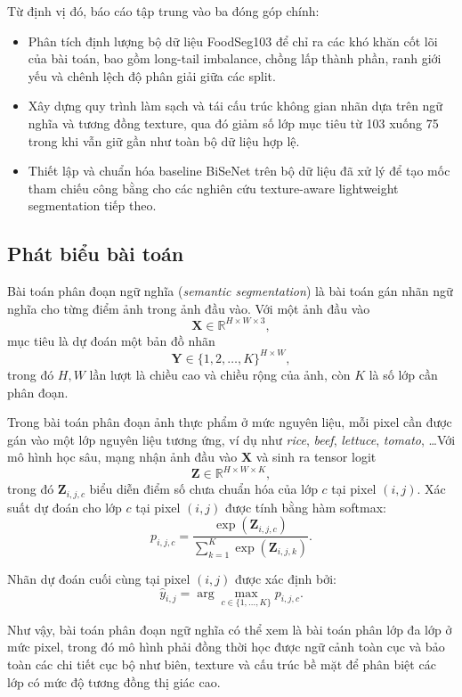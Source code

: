 Từ định vị đó, báo cáo tập trung vào ba đóng góp chính:
\begin{itemize}[leftmargin=1.5em]
    \item Phân tích định lượng bộ dữ liệu FoodSeg103 để chỉ ra các khó khăn cốt lõi của bài toán, bao gồm long-tail imbalance, chồng lấp thành phần, ranh giới yếu và chênh lệch độ phân giải giữa các split.
    \item Xây dựng quy trình làm sạch và tái cấu trúc không gian nhãn dựa trên ngữ nghĩa và tương đồng texture, qua đó giảm số lớp mục tiêu từ 103 xuống 75 trong khi vẫn giữ gần như toàn bộ dữ liệu hợp lệ.
    \item Thiết lập và chuẩn hóa baseline BiSeNet trên bộ dữ liệu đã xử lý để tạo mốc tham chiếu công bằng cho các nghiên cứu texture-aware lightweight segmentation tiếp theo.
\end{itemize}

\subsection{Phát biểu bài toán}

Bài toán phân đoạn ngữ nghĩa (\textit{semantic segmentation}) là bài toán gán nhãn ngữ nghĩa cho từng điểm ảnh trong ảnh đầu vào. Với một ảnh đầu vào
\[
\mathbf{X} \in \mathbb{R}^{H \times W \times 3},
\]
mục tiêu là dự đoán một bản đồ nhãn
\[
\mathbf{Y} \in \{1,2,\dots,K\}^{H \times W},
\]
trong đó $H, W$ lần lượt là chiều cao và chiều rộng của ảnh, còn $K$ là số lớp cần phân đoạn.

Trong bài toán phân đoạn ảnh thực phẩm ở mức nguyên liệu, mỗi pixel cần được gán vào một lớp nguyên liệu tương ứng, ví dụ như \textit{rice}, \textit{beef}, \textit{lettuce}, \textit{tomato}, \dots Với mô hình học sâu, mạng nhận ảnh đầu vào $\mathbf{X}$ và sinh ra tensor logit
\[
\mathbf{Z} \in \mathbb{R}^{H \times W \times K},
\]
trong đó $\mathbf{Z}_{i,j,c}$ biểu diễn điểm số chưa chuẩn hóa của lớp $c$ tại pixel $(i,j)$. Xác suất dự đoán cho lớp $c$ tại pixel $(i,j)$ được tính bằng hàm softmax:
\[
p_{i,j,c} = \frac{\exp(\mathbf{Z}_{i,j,c})}{\sum_{k=1}^{K} \exp(\mathbf{Z}_{i,j,k})}.
\]

Nhãn dự đoán cuối cùng tại pixel $(i,j)$ được xác định bởi:
\[
\hat{y}_{i,j} = \arg\max_{c \in \{1,\dots,K\}} p_{i,j,c}.
\]

Như vậy, bài toán phân đoạn ngữ nghĩa có thể xem là bài toán phân lớp đa lớp ở mức pixel, trong đó mô hình phải đồng thời học được ngữ cảnh toàn cục và bảo toàn các chi tiết cục bộ như biên, texture và cấu trúc bề mặt để phân biệt các lớp có mức độ tương đồng thị giác cao.

